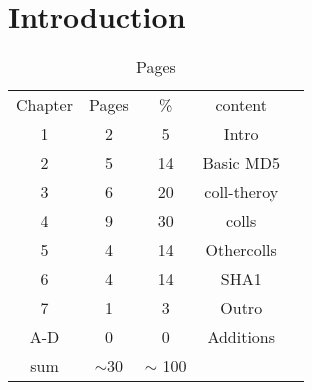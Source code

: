 \chapter{Introduction}
%
%
%
\begin{table}[]
    \caption*{Pages}
    \begin{tabular}{ccccc}
    Chapter & Pages & \%    & content   &  \\
        1   &   2   &   5   & Intro     &  \\
        2   &   5   &   14  & Basic MD5 &  \\
        3   &   6   &   20  & coll-theroy & \\
        4   &   9   &   30  & colls    & \\
        5   &   4   &   14  & Othercolls& \\
        6   &   4   &   14  & SHA1      & \\
        7   &   1   &    3  & Outro     & \\
      A-D   &   0   &    0  & Additions & \\
      sum   &$\sim$30 & $\sim$ 100 &    & \\
    \end{tabular}
    \end{table}

